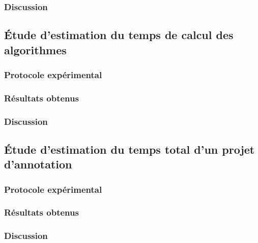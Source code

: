 			\subsubsection{Discussion}
		
		\subsection{Étude d'estimation du temps de calcul des algorithmes}
		
			\subsubsection{Protocole expérimental}

			\subsubsection{Résultats obtenus}

			\subsubsection{Discussion}
		
		\subsection{Étude d'estimation du temps total d'un projet d'annotation}
		
			\subsubsection{Protocole expérimental}

			\subsubsection{Résultats obtenus}

			\subsubsection{Discussion}
	

